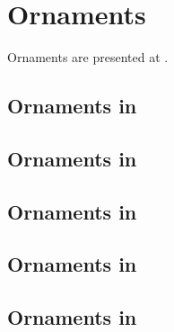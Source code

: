 



\chapter{Ornaments}\label{Ornaments}

Ornaments are presented at .


\section{Ornaments in \mxsrToMsr{}}


\section{Ornaments in \mxsrToMsr{}}


\section{Ornaments in \msrToMsr{}}


\section{Ornaments in \msrToLpsr{}}


\section{Ornaments in \lpsrToLilypond{}}


